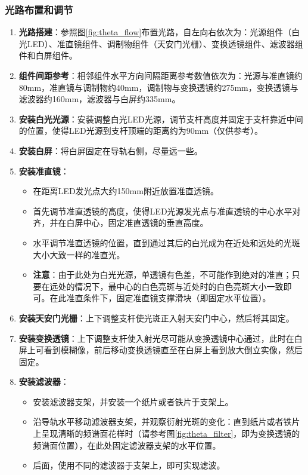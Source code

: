 \documentclass[11pt]{article}
\begin{document}
\subsubsection{光路布置和调节}
\begin{enumerate}
    \item \textbf{光路搭建}：参照图\ref{fig:theta_flow}布置光路，自左向右依次为：光源组件（白光LED）、准直镜组件、调制物组件（天安门光栅）、变换透镜组件、滤波器组件和白屏组件。
    \item \textbf{组件间距参考}：相邻组件水平方向间隔距离参考数值依次为：光源与准直镜约80mm，准直镜与调制物约40mm，调制物与变换透镜约275mm，变换透镜与滤波器约160mm，滤波器与白屏约335mm。
    \item \textbf{安装白光光源}：安装调整白光LED光源，调节支杆高度并固定于支杆靠近中间的位置，使得LED光源到支杆顶端的距离约为90mm（仅供参考）。
    \item \textbf{安装白屏}：将白屏固定在导轨右侧，尽量远一些。
    \item \textbf{安装准直镜}：
    \begin{itemize}
        \item 在距离LED发光点大约150mm附近放置准直透镜。
        \item 首先调节准直透镜的高度，使得LED光源发光点与准直透镜的中心水平对齐，并在白屏中心，固定准直透镜的垂直高度。
        \item 水平调节准直透镜的位置，直到通过其后的白光成为在近处和远处的光斑大小大致一样的准直光。
        \item \textbf{注意}：由于此处为白光光源，单透镜有色差，不可能作到绝对的准直；只要在远处的情况下，最中心的白色亮斑与近处时的白色亮斑大小一致即可。在此准直条件下，固定准直镜支撑滑块（即固定水平位置）。
    \end{itemize}
    \item \textbf{安装天安门光栅}：上下调整支杆使光斑正入射天安门中心，然后将其固定。
    \item \textbf{安装变换透镜}：上下调整支杆使入射光尽可能从变换透镜中心通过，此时在白屏上可看到模糊像，前后移动变换透镜直至在白屏上看到放大倒立实像，然后固定。
    \item \textbf{安装滤波器}：
    \begin{itemize}
        \item 安装滤波器支架，并安装一个纸片或者铁片于支架上。
        \item 沿导轨水平移动滤波器支架，并观察衍射光斑的变化：直到纸片或者铁片上呈现清晰的频谱面花样时（请参考图\ref{fig:theta_filter}，即为变换透镜的频谱面位置），在此处固定滤波器支架的水平位置。
        \item 后面，使用不同的滤波器于支架上，即可实现滤波。
    \end{itemize}
\end{enumerate}
\end{document}
